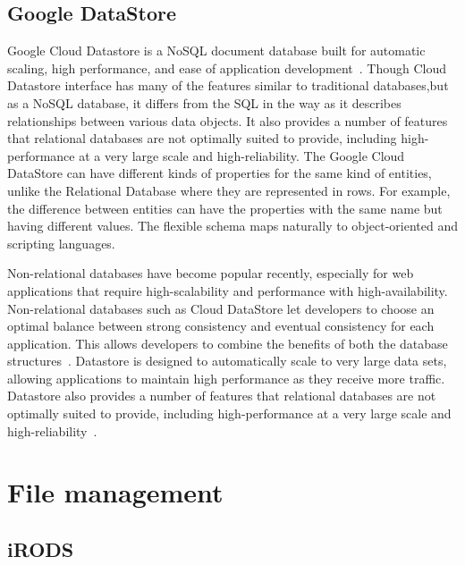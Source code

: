 {     \pv


\subsection{Google DataStore}

Google Cloud Datastore is a NoSQL document database built for
automatic scaling, high performance, and ease of application
development~\cite{www-google-datastore}. Though Cloud Datastore
interface has many of the features similar to traditional
databases,but as a NoSQL database, it differs from the SQL in the way
as it describes relationships between various data objects. It also
provides a number of features that relational databases are not
optimally suited to provide, including high-performance at a very
large scale and high-reliability. The Google Cloud DataStore can have
different kinds of properties for the same kind of entities, unlike
the Relational Database where they are represented in rows. For
example, the difference between entities can have the properties with
the same name but having different values. The flexible schema maps
naturally to object-oriented and scripting languages.

Non-relational databases have become popular recently, especially for
web applications that require high-scalability and performance with
high-availability. Non-relational databases such as Cloud DataStore
let developers to choose an optimal balance between strong consistency
and eventual consistency for each application. This allows developers
to combine the benefits of both the database
structures~\cite{www-google-datastore-2}.  Datastore is designed to
automatically scale to very large data sets, allowing applications to
maintain high performance as they receive more traffic. Datastore also
provides a number of features that relational databases are not
optimally suited to provide, including high-performance at a very
large scale and high-reliability~\cite{www-google-datastore}.

\section{File management}
\label{S:o-file-management}


\subsection{iRODS}

}
